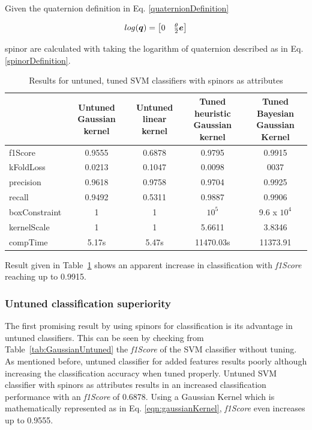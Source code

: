 Given the quaternion definition in  Eq. \ref{quaternionDefinition} 

\begin{equation}{\label{spinorDefinition}}
log(\bm{q}) = \begin{bmatrix} 
0 & \frac{\theta}{2} \bm{e} \\
\end{bmatrix}
\end{equation}

spinor are calculated with taking the logarithm of quaternion described as in Eq. \ref{spinorDefinition}.

\begin{table}[hbt!]
\caption{\label{tab:spinorsGaussian} Results for untuned, tuned SVM classifiers with spinors as attributes}
\centering
\begin{tabular}{lcccc}
\hline
& \makecell{Untuned \\ Gaussian kernel} & \makecell{Untuned \\ linear kernel} & \makecell{Tuned heuristic \\ Gaussian kernel}& \makecell{Tuned Bayesian \\ Gaussian Kernel}\\\hline
f1Score& 0.9555 & 0.6878 & 0.9795 & 0.9915\\
kFoldLoss & 0.0213 & 0.1047 & 0.0098 & 0037 \\
precision& 0.9618 & 0.9758 & 0.9704 & 0.9925\\
recall& 0.9492 & 0.5311 & 0.9887 & 0.9906\\
boxConstraint& 1 & 1 & $10^{5}$ & 9.6 x $10^{4}$ \\
kernelScale& 1 & 1 & 5.6611 & 3.8346 \\
compTime & 5.17s& 5.47s &11470.03s& 11373.91\\
\hline
\end{tabular}
\end{table}

Result given in Table~\ref{tab:spinorsGaussian} shows an apparent increase in classification with \emph{f1Score} reaching up to 0.9915.

\subsubsection{Untuned classification superiority}

The first promising result by using spinors for classification is its advantage in untuned classifiers. This can be seen by checking from Table~\ref{tab:GaussianUntuned} the \emph{f1Score} of the SVM classifier without tuning. As mentioned before, untuned classifier for added features results poorly although increasing the classification accuracy when tuned properly. Untuned SVM classifier with spinors as attributes results in an increased classification performance with an \emph{f1Score} of 0.6878. Using a Gaussian Kernel which is mathematically represented as in Eq. \ref{eqn:gaussianKernel}, \emph{f1Score} even increases up to 0.9555.

